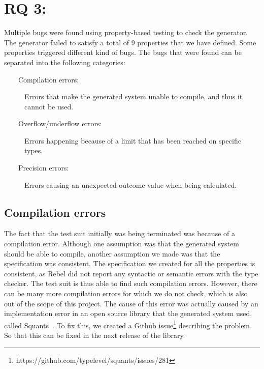 \section{RQ 3: \rqThree{}}
Multiple bugs were found using property-based testing to check the generator. The generator failed to satisfy a total of 9 properties that we have defined. Some properties triggered different kind of bugs. The bugs that were found can be separated into the following categories:
\begin{description}
  \item[~~~~Compilation errors:] Errors that make the generated system unable to compile, and thus it cannot be used.
  \item[~~~~Overflow/underflow errors:] Errors happening because of a limit that has been reached on specific types.
  \item[~~~~Precision errors:] Errors causing an unexpected outcome value when being calculated.
\end{description}
\subsection*{Compilation errors}
The fact that the test suit initially was being terminated was because of a compilation error. Although one assumption was that the generated system should be able to compile, another assumption we made was that the specification was consistent. The specification we created for all the properties is consistent, as Rebel did not report any syntactic or semantic errors with the type checker. The test suit is thus able to find such compilation errors. However, there can be many more compilation errors for which we do not check, which is also out of the scope of this project. The cause of this error was actually caused by an implementation error in an open source library that the generated system used, called Squants~\cite{siteSquants2017}. To fix this, we created a Github issue\footnote{https://github.com/typelevel/squants/issues/281} describing the problem. So that this can be fixed in the next release of the library.


